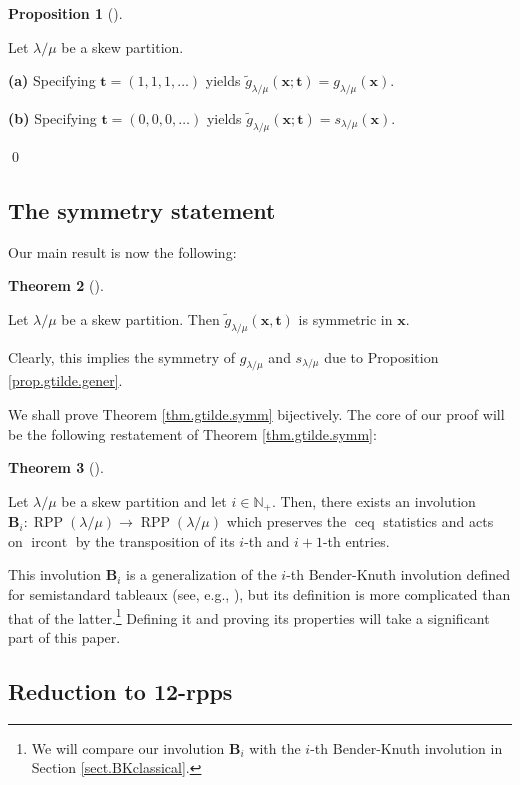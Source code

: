 \documentclass[numbers=enddot,12pt,final,onecolumn,notitlepage]{scrartcl}%
\theoremstyle{definition}
\newtheorem{theo}{Theorem}[section]
\newenvironment{theorem}[1][]
{\begin{theo}[#1]\begin{leftbar}}
{\end{leftbar}\end{theo}}
\newtheorem{prop}[theo]{Proposition}
\newenvironment{proposition}[1][]
{\begin{prop}[#1]\begin{leftbar}}
{\end{leftbar}\end{prop}}
\def\ceq{{\operatorname*{ceq}}}
\def\ircont{{\operatorname*{ircont}}}
\def\t{{\mathbf{t}}}
\def\x{{\mathbf{x}}}
\def\lm{{\lambda/\mu}}
\begin{document}
\begin{proposition}
\label{prop.gtilde.gener}Let $\lambda/\mu$ be a skew partition.

\textbf{(a)} Specifying $\t=\left(
1,1,1,\ldots\right)  $ yields $\widetilde{g}_{\lambda/\mu}(\x;\t)=g_{\lambda/\mu}(\x)$.

\textbf{(b)} Specifying $\t =\left(
0,0,0,\ldots\right)  $ yields $\widetilde{g}_{\lambda/\mu}(\x;\t)=s_{\lambda/\mu}(\x)$.
\end{proposition} \qed


\subsection{The symmetry statement}

Our main result is now the following:

\begin{theorem}
\label{thm.gtilde.symm}Let $\lambda/\mu$ be a skew partition. Then
$\widetilde{g}_{\lambda/\mu}(\x,\t)$ is symmetric in $\x$.
\end{theorem}


Clearly, this implies the symmetry of $g_\lm$ and $s_\lm$ due to Proposition \ref{prop.gtilde.gener}.


We shall prove Theorem \ref{thm.gtilde.symm} bijectively. The core of our
proof will be the following restatement of Theorem \ref{thm.gtilde.symm}:


 
\begin{theorem}
\label{thm.BK}Let $\lambda/\mu$ be a skew partition and let $i\in\mathbb{N}_{+}$. Then, there exists an
involution $\mathbf{B}_{i}:\operatorname*{RPP}\left(  \lambda/\mu\right)
\rightarrow\operatorname*{RPP}\left(  \lambda/\mu\right)  $ which preserves the $\ceq$ statistics and acts on $\ircont$ by the transposition of its $i$-th and $i+1$-th entries.
\end{theorem}


This involution $\mathbf{B}_{i}$ is a generalization of the $i$-th
Bender-Knuth involution defined for semistandard tableaux (see, e.g.,
\cite[proof of Proposition 2.11]{GriRei15}), but its definition is more
complicated than that of the latter.\footnote{We will compare our involution
$\mathbf{B}_{i}$ with the $i$-th Bender-Knuth involution in Section
\ref{sect.BKclassical}.} Defining it and proving its properties will take a
significant part of this paper.

\subsection{Reduction to 12-rpps}
\end{document}
